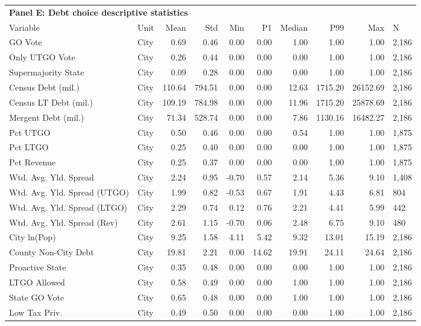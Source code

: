 \begin{table}[H]
\centering
\begin{tabular*}{\textwidth}{@{\extracolsep{\fill}}llrrrrrrrl}
\multicolumn{10}{l}{\textbf{Panel E: Debt choice descriptive statistics}}\\

\addlinespace
  \toprule
Variable & Unit & Mean & Std & Min & P1 & Median & P99 & Max & N \\ 
  \hline
GO Vote & City & 0.69 & 0.46 & 0.00 & 0.00 & 1.00 & 1.00 & 1.00 & 2,186 \\ 
  Only UTGO Vote & City & 0.26 & 0.44 & 0.00 & 0.00 & 0.00 & 1.00 & 1.00 & 2,186 \\ 
  Supermajority State & City & 0.09 & 0.28 & 0.00 & 0.00 & 0.00 & 1.00 & 1.00 & 2,186 \\ 
  Census Debt (mil.) & City & 110.64 & 794.51 & 0.00 & 0.00 & 12.63 & 1715.20 & 26152.69 & 2,186 \\ 
  Census LT Debt (mil.) & City & 109.19 & 784.98 & 0.00 & 0.00 & 11.96 & 1715.20 & 25878.69 & 2,186 \\ 
  Mergent Debt (mil.) & City & 71.34 & 528.74 & 0.00 & 0.00 & 7.86 & 1130.16 & 16482.27 & 2,186 \\ 
  Pct UTGO & City & 0.50 & 0.46 & 0.00 & 0.00 & 0.54 & 1.00 & 1.00 & 1,875 \\ 
  Pct LTGO & City & 0.25 & 0.40 & 0.00 & 0.00 & 0.00 & 1.00 & 1.00 & 1,875 \\ 
  Pct Revenue & City & 0.25 & 0.37 & 0.00 & 0.00 & 0.00 & 1.00 & 1.00 & 1,875 \\ 
  Wtd. Avg. Yld. Spread & City & 2.24 & 0.95 & -0.70 & 0.57 & 2.14 & 5.36 & 9.10 & 1,408 \\ 
  Wtd. Avg. Yld. Spread (UTGO) & City & 1.99 & 0.82 & -0.53 & 0.67 & 1.91 & 4.43 & 6.81 &   804 \\ 
  Wtd. Avg. Yld. Spread (LTGO) & City & 2.29 & 0.74 & 0.12 & 0.76 & 2.21 & 4.41 & 5.99 &   442 \\ 
  Wtd. Avg. Yld. Spread (Rev) & City & 2.61 & 1.15 & -0.70 & 0.06 & 2.48 & 6.75 & 9.10 &   480 \\ 
  City ln(Pop) & City & 9.25 & 1.58 & 4.11 & 5.42 & 9.32 & 13.01 & 15.19 & 2,186 \\ 
  County Non-City Debt & City & 19.81 & 2.21 & 0.00 & 14.62 & 19.91 & 24.11 & 24.64 & 2,186 \\ 
  Proactive State & City & 0.35 & 0.48 & 0.00 & 0.00 & 0.00 & 1.00 & 1.00 & 2,186 \\ 
  LTGO Allowed & City & 0.58 & 0.49 & 0.00 & 0.00 & 1.00 & 1.00 & 1.00 & 2,186 \\ 
  State GO Vote & City & 0.65 & 0.48 & 0.00 & 0.00 & 1.00 & 1.00 & 1.00 & 2,186 \\ 
  Low Tax Priv. & City & 0.49 & 0.50 & 0.00 & 0.00 & 0.00 & 1.00 & 1.00 & 2,186 \\ 
   \hline
\end{tabular*}
\end{table}
